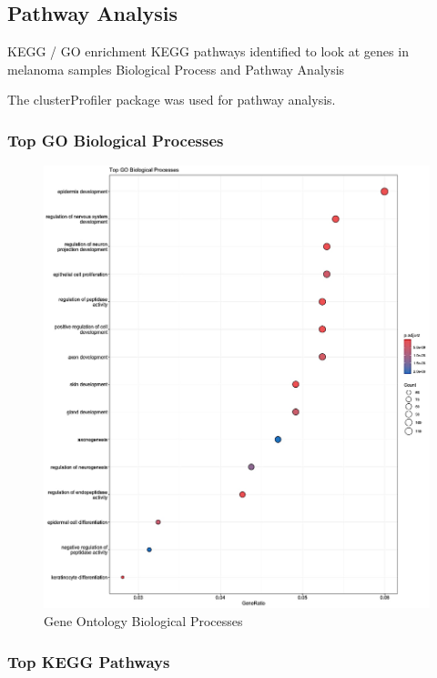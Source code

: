\documentclass[
]{article}
\begin{document}
\newpage

\subsection{Pathway Analysis}\label{pathway-analysis}

KEGG / GO enrichment KEGG pathways identified to look at genes in
melanoma samples Biological Process and Pathway Analysis

The clusterProfiler package was used for pathway analysis.

\subsubsection{Top GO Biological
Processes}\label{top-go-biological-processes}

\begin{figure}

{\centering \includegraphics[width=0.8\linewidth]{Images/Top_GO_Biological_Processes} 

}

\caption{Gene Ontology Biological Processes}\label{fig:unnamed-chunk-30}
\end{figure}

\newpage

\subsubsection{Top KEGG Pathways}\label{top-kegg-pathways}
\end{document}
